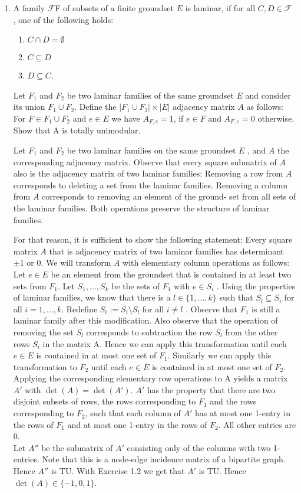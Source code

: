 \documentclass[11pt]{article}
\begin{document}
\begin{enumerate}[1)]
\item A family $\mathcal{F}$F of subsets of a finite groundset $E$ is laminar, if for all $C ,D ∈ \mathcal{F}$ , one of the following holds:
\begin{enumerate}
\item $C ∩ D = \emptyset$ 
\item $C ⊆ D$
\item $D ⊆ C$.
\end{enumerate}
Let $F_1$ and $F_2$ be two laminar families of the same groundset $E$ and consider its union
$F_1 ∪ F_2$. Define the $|F_1 ∪ F_2| × |E |$ adjacency matrix $A$ as follows: For $F ∈ F_1 ∪ F_2$ and $e ∈ E$
we have $A_{F,e} = 1$, if $e ∈ F$ and $A_{F,e} = 0$ otherwise.\\
Show that A is totally unimodular.

\begin{solution}
Let $F_1$ and $F_2$ be two laminar families on the same groundset $E$ , and $A$ the corresponding
adjacency matrix. Observe that every square submatrix of $A$ also is the adjacency matrix of
two laminar families: Removing a row from $A$ corresponds to deleting a set from the laminar
families. Removing a column from $A$ corresponds to removing an element of the ground-
set from all sets of the laminar families. Both operations preserve the structure of laminar
families.


For that reason, it is sufficient to show the following statement: Every square matrix $A$ that
is adjacency matrix of two laminar families has determinant $±1$ or $0$.
We will transform $A$ with elementary column operations as follows: Let $e ∈ E$ be an element from the groundset that is contained in at least two sets from $F_1$. Let $S_1,...,S_k$ be
the sets of $F_1$ with $e ∈ S_i$ . Using the properties of laminar families, we know that there is a
$l ∈ \{1,...,k\}$ such that $S_l ⊆ S_i$ for all $i= 1,...,k$. Redefine $S_i := S_i \setminus S_l$ for all $i\neq l$ . Observe
that $F_1$ is still a laminar family after this modification. Also observe that the operation of removing the set $S_l$ corresponds to subtraction the row $S_l$ from the other rows $S_i$ in the matrix
A.
Hence we can apply this transformation until each $e ∈ E$ is contained in at most one set of
$F_1$. Similarly we can apply this transformation to $F_2$ until each $e ∈ E$ is contained in at most
one set of $F_2$. Applying the corresponding elementary row operations to A yields a matrix
$A'$ with $\det(A)= \det(A')$.  $A'$ has the property that there are two disjoint subsets of rows, the
rows corresponding to $F_1$ and the rows corresponding to $F_2$, such that each column of $A'$
has at most one 1-entry in the rows of $F_1$ and at most one 1-entry in the rows of $F_2$. All other
entries are $0$.\\
Let $A''$ be the submatrix of $A'$ consisting only of the columns with two 1-entries. Note
that this is a node-edge incidence matrix of a bipartite graph. Hence $A''$ is TU. With Exercise 1.2 we get that $A'$ is TU. Hence $\det(A) ∈ \{−1,0,1\}$.
\end{solution}



\end{enumerate}
\end{document}
